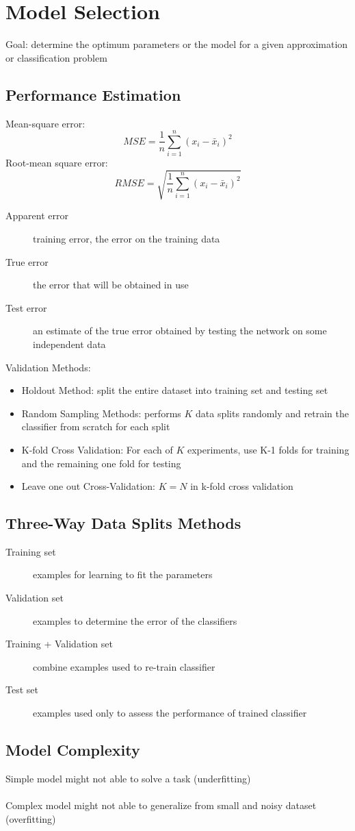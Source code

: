 \chapter{Model Selection}
Goal: determine the optimum parameters or the model for a given approximation or classification problem

\section{Performance Estimation}
Mean-square error:
$$MSE=\frac{1}{n} \sum_{i=1}^{n}(x_i - \bar{x}_i)^{2}$$
Root-mean square error:
$$RMSE=\sqrt{\frac{1}{n} \sum_{i=1}^{n}(x_i - \bar{x}_i)^{2}}$$

\begin{description}
\item[Apparent error] training error, the error on the training data
\item[True error] the error that will be obtained in use
\item[Test error] an estimate of the true error obtained by testing the network on some independent data
\end{description}

\noindent Validation Methods:
\begin{itemize}
\item Holdout Method: split the entire dataset into training set and testing set
\item Random Sampling Methods: performs $K$ data splits randomly and retrain the classifier from scratch for each split
\item K-fold Cross Validation: For each of $K$ experiments, use K-1 folds for training and the remaining one fold for testing
\item Leave one out Cross-Validation: $K=N$ in k-fold cross validation
\end{itemize}

\section{Three-Way Data Splits Methods}
\begin{description}
\item[Training set] examples for learning to fit the parameters
\item[Validation set] examples to determine the error of the classifiers
\item[Training + Validation set] combine examples used to re-train classifier
\item[Test set] examples used only to assess the performance of trained classifier
\end{description}

\section{Model Complexity}
Simple model might not able to solve a task (underfitting) \\ \\
Complex model might not able to generalize from small and noisy dataset (overfitting)